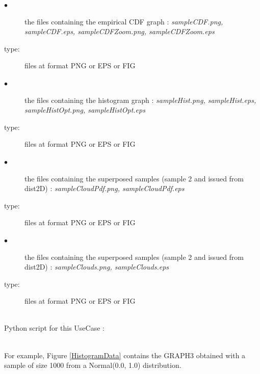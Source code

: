              {
               \begin{description}
               \item[$\bullet$] the files containing the empirical CDF graph : {\itshape sampleCDF.png, sampleCDF.eps, sampleCDFZoom.png, sampleCDFZoom.eps}
               \item[type:]  files at format PNG or EPS or FIG
               \item[$\bullet$] the files containing the histogram graph : {\itshape sampleHist.png, sampleHist.eps, sampleHistOpt.png, sampleHistOpt.eps}
               \item[type:]  files at format PNG or EPS or FIG
               \item[$\bullet$] the files containing the superposed samples (sample 2 and issued from dist2D)  : {\itshape sampleCloudPdf.png, sampleCloudPdf.eps}
               \item[type:]  files at format PNG or EPS or FIG
               \item[$\bullet$] the files containing the superposed samples (sample 2 and issued from dist2D)  : {\itshape sampleClouds.png, sampleClouds.eps}
               \item[type:]  files at format PNG or EPS or FIG
               \end{description}
             }

             \textspace\\
             Python script for this UseCase :



             \textspace\\


             For example, Figure \ref{HistogramData} contains the  GRAPH3 obtained with a sample of size 1000 from a Normal(0.0, 1.0) distribution.\\

